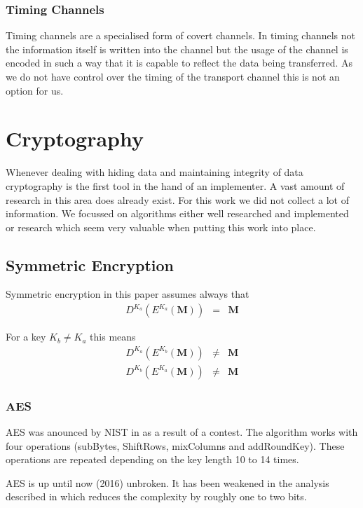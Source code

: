 \subsubsection{Timing Channels}
Timing channels are a specialised form of covert channels. In timing channels not the information itself is written into the channel but the usage of the channel is encoded in such a way that it is capable to reflect the data being transferred. As we do not have control over the  timing of the transport channel this is not an option for us.

\section{Cryptography}
Whenever dealing with hiding data and maintaining integrity of data cryptography is the first tool in the hand of an implementer. A vast amount of research in this area does already exist. For this work we did not collect a lot of information. We focussed on algorithms either well researched and implemented or research which seem very valuable when putting this work into place. 

\subsection{Symmetric Encryption}
Symmetric encryption in this paper assumes always that
\begin{eqnarray}
	D^{K_a}\left(E^{K_a}\left(\mathbf{M}\right)\right) & = & \mathbf{M}
\end{eqnarray} 

For a key $K_b\neq K_a$ this means
\begin{eqnarray}
	D^{K_a}\left(E^{K_b}\left(\mathbf{M}\right)\right) & \neq & \mathbf{M}\\
	D^{K_b}\left(E^{K_a}\left(\mathbf{M}\right)\right) & \neq & \mathbf{M}
\end{eqnarray} 

\subsubsection{AES}
AES was anounced by NIST in \citeyear{standard2001announcing} as a result of a contest. The algorithm works with four operations (subBytes, ShiftRows, mixColumns and addRoundKey). These operations are repeated depending on the key length 10 to 14 times. 

AES is up until now (2016) unbroken. It has been weakened in the analysis described in \cite{tao2015improving} which reduces the complexity by roughly one to two bits. 

